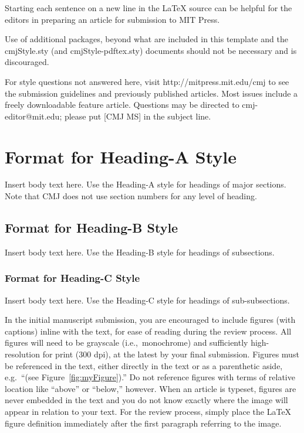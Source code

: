 \documentclass[letterpaper, 12pt]{article}
\begin{document}
Starting each sentence on a new line in the LaTeX source can be helpful for the editors in preparing an article for submission to MIT Press.

Use of additional packages, beyond what are included in this template and the cmjStyle.sty (and cmjStyle-pdftex.sty) documents should not be necessary and is discouraged. 

For style questions not answered here, visit http://mitpress.mit.edu/cmj to see the submission guidelines and previously published articles.  
Most issues include a freely downloadable feature article.  
Questions may be directed to cmj-editor@mit.edu; please put [CMJ MS] in the subject line.

\parskip 18pt

%
\section{Format for Heading-A Style}

Insert body text here.  
Use the Heading-A style for headings of major sections.
Note that CMJ does not use section numbers for any level of heading.

\vspace*{24pt}

\subsection{Format for Heading-B Style}

Insert body text here.  
Use the Heading-B style for headings of subsections.

\subsubsection{Format for Heading-C Style}

Insert body text here.
Use the Heading-C style for headings of sub-subsections.

In the initial manuscript submission, you are encouraged to include figures (with captions) inline with the text, for ease of reading during the review process. 
All figures will need to be grayscale (i.e.,~monochrome) and sufficiently high-resolution for print (300 dpi), at the latest by your final submission.
Figures must be referenced in the text, either directly in the text or as a parenthetic aside, e.g.~``(see Figure~\ref{fig:myFigure}).''
Do not reference figures with terms of relative location like ``above'' or ``below,'' however.
When an article is typeset, figures are never embedded in the text and you do not know exactly where the image will appear in relation to your text.
For the review process, simply place the LaTeX figure definition immediately after the first paragraph referring to the image.
\end{document}
